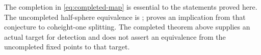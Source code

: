 \begin{remark}
The completion in \eqref{eq:completed-map} is essential to the statements
proved here.  The uncompleted half-sphere equivalence is
\cite[Conjectures 1.1.1 and 5.1.13]{BMR2026};
\cite[Proposition 5.1.17]{BMR2026} proves an implication from that
conjecture to coheight-one splitting.  The completed theorem above
supplies an actual target for detection and does not assert an
equivalence from the uncompleted fixed points to that target.
\end{remark}
